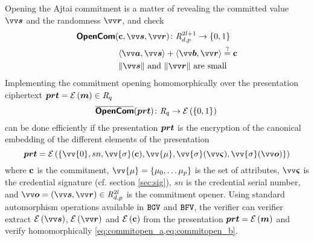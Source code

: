 Opening the Ajtai commitment is a matter of revealing the committed value $\pv{s}$ and the randomness $\pv{r}$, and check 
\begin{subequations}\label{eq:commitopen}
\begin{align}
    \bkw{OpenCom}(&\pc,\pv{s},\pv{r})\colon \intring_{d,p}^{2l+1} \to \{0,1\} \nonumber\\
    &\inprod{\pv{a}}{\pv{s}}+\inprod{\pv{b}}{\pv{r}} \stackrel{?}{=} \pc \label{eq:commitopen_a}\\
    &\|\pv{s}\| \textrm{ and } \|\pv{r}\| \textrm{ are small} \label{eq:commitopen_b}
\end{align} 
\end{subequations}
Implementing the commitment opening homomorphically over the presentation ciphertext $\bm{prt} = \mathcal{E}\left({\bm{m}}\right) \in \mathit{R}_q$
\begin{equation}\label{eq:hcommitopen}
    \overline{\textsf{\textbf{OpenCom}}}(\bm{prt})\colon \mathit{R}_{q} \to \mathcal{E}\left({\{0,1\}}\right)\\
\end{equation}
can be done efficiently if the presentation $\bm{prt}$ is the encryption of the canonical embedding of the different elements of the presentation 
\begin{equation}\label{eq:presentation}
    \p{prt}=\enc{\{\vv{0},sn,\vv{\sigma}(\pc),\vv{\mu},\vv{\sigma}(\pv{\varsigma}),\vv{\sigma}(\pv{o})\}}
\end{equation}
where $\mathbf{c}$ is the commitment, $\vv{\mu}=\{\mu_0,\ldots\mu_p\}$ is the set of attributes, $\pv{\varsigma}$ is the credential signature (cf. section \ref{sec:sig}), $sn$ is the credential serial number, and $\pv{o}=(\pv{s},\pv{r}) \in \intring_{d,p}^{2l}$ is the commitment opener. Using standard automorphism operations available in $\mathtt{BGV}$ and $\mathtt{BFV}$, the verifier can 
verifier extract $\enc{\pv{s}}$, $\enc{\pv{r}}$ and $\mathcal{E}\left({\mathbf{c}}\right)$ from the presentation $\bm{prt} =\mathcal{E}\left({\bm{m}}\right)$ and verify  homomorphically \cref{eq:commitopen_a,eq:commitopen_b}.

